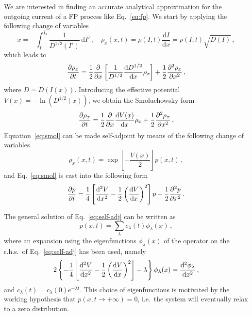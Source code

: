 \begin{chapterappendices}
We are interested in finding an accurate analytical approximation for the outgoing current of a FP process like Eq.~\eqref{eq:fp}. We start by applying the following change of variables
\begin{equation}
    x = -\int_I^{I_\mathrm{a}} \frac{1}{D^{1/2}(I')}\,\mathrm{d}I'\,,\quad \rho_x(x,t)=\rho(I,t)\frac{\mathrm{d}I}{\mathrm{d}x}=\rho(I,t)\sqrt{D(I)} \, ,
\end{equation}
which leads to
\begin{equation}
    \pdv{\rho_x}{t} = \frac{1}{2}\pdv{x} \left[\frac{1}{D^{1/2}}\dv{D^{1/2}}{x}\rho_x\right]+\frac{1}{2}\pdv[2]{\rho_x}{x}\, ,
\end{equation}
where $D=D\left(I(x)\right)$. Introducing the effective potential $V(x)=-\ln(D^{1/2}(x))$, we obtain the Smoluchowsky form~\cite{hannes1996fokker}
\begin{equation}
    \pdv{\rho_x}{t} = \frac{1}{2}\pdv{x} \dv{V(x)}{x} \rho_x+\frac{1}{2}\pdv[2]{\rho_x}{x}\, .
    \label{eq:smol}
\end{equation}
Equation~\eqref{eq:smol} can be made self-adjoint by means of the following change of variables 
\begin{equation}
    \rho_x(x,t) = \exp\left[-\frac{V(x)}{2}\right]p(x,t) \, ,
\end{equation}
and Eq.~\eqref{eq:smol} is cast into the following form
\begin{equation}
    \pdv{p}{t} = \frac{1}{4}\left[\dv[2]{V}{x} - \frac{1}{2}\left(\dv{V}{x}\right)^2\right]p + \frac{1}{2}\pdv[2]{p}{x}\,.
    \label{eq:self-adj}
\end{equation}

The general solution of Eq.~\eqref{eq:self-adj} can be written as
\begin{equation}
    p(x,t) = \sum_\lambda c_\lambda(t)\phi_\lambda(x)\,,
    \label{eq:expansion}
\end{equation}
where an expansion using the eigenfunctions $\phi_\lambda(x)$ of the operator on the r.h.s.\ of Eq.~\eqref{eq:self-adj} has been used, namely 
\begin{equation}
    2\left\{-\frac{1}{4}\left[\dv[2]{V}{x} - \frac{1}{2}\left(\dv{V}{x}\right)^2\right] - \lambda \right\}\phi_\lambda(x) = \dv[2]{\phi_\lambda}{x}\,,
    \label{eq:eigenproblem}
\end{equation}
and $c_\lambda(t) = c_\lambda(0)e^{-\lambda t}$. This choice of eigenfunctions is motivated by the working hypothesis that $p(x,t\to+\infty)=0$, i.e.\ the system will eventually relax to a zero distribution.


\end{chapterappendices}
